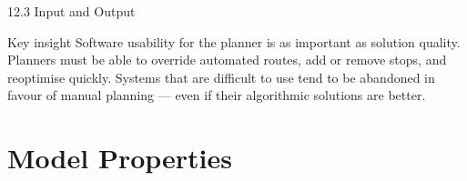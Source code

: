 \documentclass[aspectratio=169,10pt]{beamer}
\begin{document}
\begin{frame}[allowframebreaks]{12.3 \; Input and Output}
  \begin{alertblock}{Key insight}
    Software usability for the planner is as important as solution quality.
    Planners must be able to override automated routes, add or remove stops,
    and reoptimise quickly.
    Systems that are difficult to use tend to be abandoned in favour of
    manual planning --- even if their algorithmic solutions are better.
  \end{alertblock}
\end{frame}

\section{Model Properties}
\end{document}
